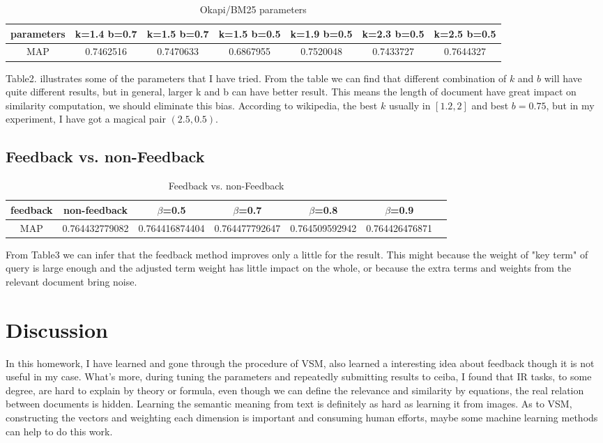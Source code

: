 \documentclass[11pt, oneside]{article}   	%
\begin{document}
\begin{table}[H]
\centering
\begin{tabular}{|c|c|c|c|c|c|c|}
\hline
parameters  & k=1.4 b=0.7    & k=1.5 b=0.7    & k=1.5 b=0.5    & k=1.9 b=0.5    & k=2.3 b=0.5    & k=2.5 b=0.5    \\ \hline
MAP        & 0.7462516 & 0.7470633 & 0.6867955 & 0.7520048 & 0.7433727 & 0.7644327 \\ \hline
\end{tabular}
\caption{ Okapi/BM25 parameters}
\end{table}
\noindent Table2. illustrates some of the parameters that I have tried. From the table we can find that different combination of $k$ and $b$ will have quite different results, but in general, larger k and b can have better result. This means the length of document have great impact on similarity computation, we should eliminate this bias. According to wikipedia, the best $k$ usually in $[1.2,2]$ and best $b=0.75$,  but in my experiment, I have got a magical pair $(2.5, 0.5)$. 

\subsection{Feedback vs. non-Feedback}
\begin{table}[H]
\centering
\begin{tabular}{|c|c|c|c|c|cl}
\hline
feedback & non-feedback   & $\beta$=0.5           & $\beta$=0.7           & $\beta$=0.8     & $\beta$=0.9      \\ \hline
MAP      & 0.764432779082 & 0.764416874404 & 0.764477792647 & 0.764509592942 & 0.764426476871 \\ \hline
\end{tabular}
\caption{Feedback vs. non-Feedback}
\end{table}
From Table3 we can infer that the feedback method improves only a little for the result. This might because the weight of "key term" of query is large enough and the adjusted term weight has little impact on the whole, or because the extra terms and weights from the relevant document bring noise.

\section{Discussion}
In this homework, I have learned and gone through the procedure of VSM, also learned a interesting idea about feedback though it is not useful in my case. 
What's more, during tuning the parameters and repeatedly submitting results to ceiba, I found that IR tasks, to some degree, are hard to explain by theory or formula, even though we can define the relevance and similarity by equations,  the real relation between documents is hidden. Learning the semantic meaning from text is definitely as hard as learning it from images. As to VSM, constructing the vectors and weighting each dimension is important and consuming human efforts, maybe some machine learning methods can help to do this work.
\end{document}
